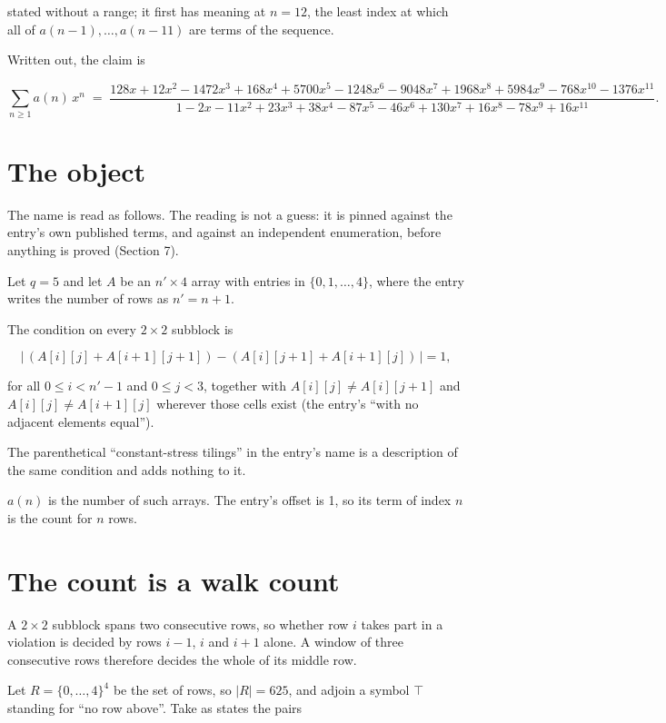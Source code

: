 \documentclass[11pt]{article}
\theoremstyle{definition}
\begin{document}
stated without a range; it first has meaning at $n = 12$, the least index at which all of $a(n-1),\dots,a(n-11)$ are terms of the sequence.

Written out, the claim is

\[\sum_{n \ge 1} a(n)\,x^n \;=\; \frac{128x + 12x^{2} - 1472x^{3} + 168x^{4} + 5700x^{5} - 1248x^{6} - 9048x^{7} + 1968x^{8} + 5984x^{9} - 768x^{10} - 1376x^{11}}{1 - 2x - 11x^{2} + 23x^{3} + 38x^{4} - 87x^{5} - 46x^{6} + 130x^{7} + 16x^{8} - 78x^{9} + 16x^{11}}.\]

\section{The object}

The name is read as follows. The reading is not a guess: it is pinned against the entry's own published terms, and against an independent enumeration, before anything is proved (Section 7).

Let $q = 5$ and let $A$ be an $n' \times 4$ array with entries in $\{0,1,\dots,4\}$, where the entry writes the number of rows as $n' = n + 1$.

The condition on every $2 \times 2$ subblock is

\[\bigl|\,(A[i][j] + A[i{+}1][j{+}1]) - (A[i][j{+}1] + A[i{+}1][j])\,\bigr| = 1,\]

for all $0 \le i < n'-1$ and $0 \le j < 3$, together with $A[i][j] \ne A[i][j{+}1]$ and $A[i][j] \ne A[i{+}1][j]$ wherever those cells exist (the entry's ``with no adjacent elements equal'').

The parenthetical ``constant-stress tilings'' in the entry's name is a description of the same condition and adds nothing to it.

$a(n)$ is the number of such arrays. The entry's offset is 1, so its term of index $n$ is the count for $n$ rows.

\section{The count is a walk count}

A $2 \times 2$ subblock spans two consecutive rows, so whether row $i$ takes part in a violation is decided by rows $i-1$, $i$ and $i+1$ alone. A window of three consecutive rows therefore decides the whole of its middle row.

Let $R = \{0,\dots,4\}^{4}$ be the set of rows, so $|R| = 625$, and adjoin a symbol $\top$ standing for ``no row above''. Take as states the pairs
\end{document}
